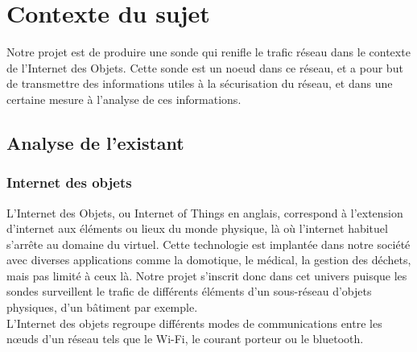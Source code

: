 \chapter{Contexte du sujet}
\label{chap:contexte}
	Notre projet est de produire une sonde qui renifle le trafic réseau dans le contexte de l'Internet des Objets. Cette sonde est un noeud dans ce réseau, et a pour but de transmettre des informations utiles à la sécurisation du réseau, et dans une certaine mesure à l'analyse de ces informations.

\section{Analyse de l'existant}
	
	\subsection{Internet des objets}
		L'Internet des Objets, ou Internet of Things en anglais, correspond à l'extension d'internet aux éléments ou lieux du monde physique, là où l'internet habituel s'arrête au domaine du virtuel.
		Cette technologie est implantée dans notre société avec diverses applications comme la domotique, le médical, la gestion des déchets, mais pas limité à ceux là.
		Notre projet s'inscrit donc dans cet univers puisque les sondes surveillent le trafic de différents éléments d'un sous-réseau d'objets physiques, d'un bâtiment par exemple. \\
		L'Internet des objets regroupe différents modes de communications entre les nœuds d'un réseau tels que le Wi-Fi, le courant porteur ou le bluetooth.%
		
